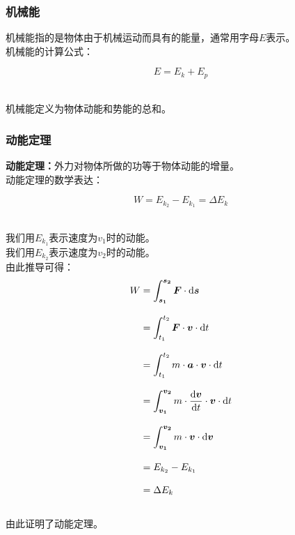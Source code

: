 \documentclass[UTF8]{ctexart}
\newcommand*{\veb}[1]{\vb*{#1}}
\newcommand*{\dif}{\mathop{}\!\mathrm{d}}
\begin{document}
\newpage

\subsubsection{机械能}
    机械能指的是物体由于机械运动而具有的能量，通常用字母$E$表示。\\[3mm]
    机械能的计算公式：
    \begin{large}
        \begin{equation*}
            E=E_k+E_p
        \end{equation*}
    \end{large}\\
    机械能定义为物体动能和势能的总和。\\

\subsubsection{动能定理}
    \textbf{动能定理：}外力对物体所做的功等于物体动能的增量。\\[3mm]
    动能定理的数学表达：
    \begin{large}
        \begin{equation*}
            W=E_{k_2}-E_{k_1}=\Delta E_k
        \end{equation*}
    \end{large}\\
    我们用$E_{k_1}$表示速度为$v_1$时的动能。\\[3mm]
    我们用$E_{k_2}$表示速度为$v_2$时的动能。\\[3mm]
    由此推导可得：
    \setcounter{equation}{0}
    \begin{align}
        W
        &=\int_{\veb{s_1}}^{\veb{s_2}}\veb{F}\cdot\dif\veb{s}\\[3mm]
        &=\int_{t_1}^{t_2}\veb{F}\cdot\veb{v}\cdot\dif t\\[3mm]
        &=\int_{t_1}^{t_2}m\cdot\veb{a}\cdot\veb{v}\cdot\dif t\\[3mm]
        &=\int_{\veb{v_1}}^{\veb{v_2}}m\cdot\frac{\dif\veb{v}}{\dif t}\cdot\veb{v}\cdot\dif t\\[3mm]
        &=\int_{\veb{v_1}}^{\veb{v_2}}m\cdot\veb{v}\cdot\dif\veb{v}\\[3mm]
        &=E_{k_2}-E_{k_1}\\[3mm]
        &=\Delta E_k
    \end{align}\\
    由此证明了动能定理。

\newpage
\end{document}
